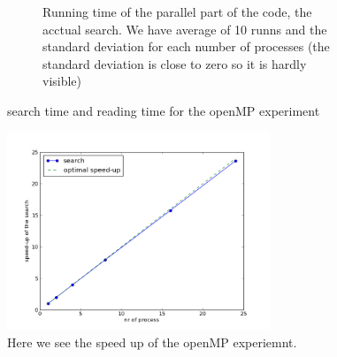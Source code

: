 \documentclass[a4paper,10pt]{article}
\begin{document}
\begin{figure}[h!t]
\begin{subfigure}[b]{0.70\textwidth}
                \caption{Running time of the parallel part of the code, the acctual search. 
                         We have average of 10 runns and the standard deviation for each number
                         of processes (the standard deviation is close to zero so it is hardly 
                         visible)}
                \label{fig:openmp_search}
        \end{subfigure}
        \caption{search time and reading time for the openMP experiment}
\end{figure}


\begin{figure}[htb]
  \centering
  \includegraphics[width=0.7\textwidth]{graphics/openmp17gb/search_speedup.png}
  \caption{Here we see the speed up of the openMP experiemnt.}
  \label{fig:openmp_speedup}
\end{figure}
\end{document}
